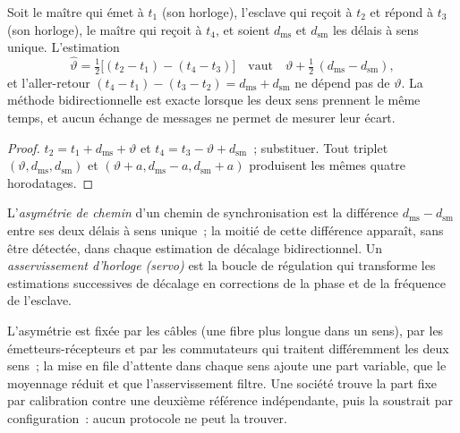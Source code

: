\begin{proposition}\label{prop:nw:time-synchronisation:offset}
Soit le maître qui émet à $t_1$ (son horloge), l'esclave qui reçoit à $t_2$ et répond à $t_3$ (son horloge), le maître qui reçoit à
$t_4$, et soient $d_{\mathrm{ms}}$ et $d_{\mathrm{sm}}$ les délais à sens unique. L'estimation
\[
  \hat\vartheta = \tfrac12\bigl[(t_2 - t_1) - (t_4 - t_3)\bigr]
  \quad\text{vaut}\quad \vartheta + \tfrac12\,(d_{\mathrm{ms}} - d_{\mathrm{sm}}),
\]
et l'aller-retour $(t_4 - t_1) - (t_3 - t_2) = d_{\mathrm{ms}} + d_{\mathrm{sm}}$ ne dépend pas de $\vartheta$. La méthode
bidirectionnelle est exacte lorsque les deux sens prennent le même temps, et aucun échange de messages ne permet de mesurer leur écart.
\end{proposition}

\begin{proof}
$t_2 = t_1 + d_{\mathrm{ms}} + \vartheta$ et $t_4 = t_3 - \vartheta + d_{\mathrm{sm}}$~; substituer. Tout triplet $(\vartheta, d_{\mathrm{ms}},
d_{\mathrm{sm}})$ et $(\vartheta + a, d_{\mathrm{ms}} - a, d_{\mathrm{sm}} + a)$ produisent les mêmes quatre horodatages.
\end{proof}

\begin{definition}\label{def:nw:time-synchronisation:asym}
L'\emph{asymétrie de chemin} d'un chemin de synchronisation est la différence $d_{\mathrm{ms}} - d_{\mathrm{sm}}$
entre ses deux délais à sens unique~; la moitié de cette différence apparaît, sans être détectée, dans chaque estimation de décalage bidirectionnel. Un \emph{asservissement d'horloge (servo)} est la
boucle de régulation qui transforme les estimations successives de décalage en corrections de la phase et de la fréquence de l'esclave.
\end{definition}

L'asymétrie est fixée par les câbles (une fibre plus longue dans un sens), par les émetteurs-récepteurs et par les commutateurs qui
traitent différemment les deux sens~; la mise en file d'attente dans chaque sens ajoute une part variable, que le moyennage réduit et
que l'asservissement filtre. Une société trouve la part fixe par calibration contre une deuxième référence indépendante, puis la soustrait par configuration~: aucun protocole ne peut la trouver.

\label{lst:nw:time-synchronisation:exchange}

